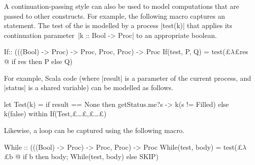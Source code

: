 A continuation-passing style can also be used to model computations that are
passed to other constructs.  For example, the following macro captures an
 statement.  The test of the  is modelled by a process
|test(k)| that applies its continuation parameter~|k :: Bool -> Proc| to an
appropriate boolean.
%
\begin{cspm}
If:: (((Bool) -> Proc) -> Proc, Proc, Proc) -> Proc
If(test, P, Q) = test(£$\lambda$£res @ if res then P else Q)
\end{cspm}
%
For example, Scala code  (where |result| is a parameter of the current process, and
|status| is a shared variable) can be modelled as follows. 
%
\begin{cspm}
let Test(k) = if result == None then getStatus.me?s -> k(s != Filled) else k(false)
within If(Test,£\ldots£,£\ldots£)
\end{cspm}
%
Likewise, a  loop can be captured using the following macro.
%
\begin{cspm}
While :: (((Bool) -> Proc) -> Proc, Proc) -> Proc
While(test, body) = test(£$\lambda$£b @ if b then body; While(test, body) else SKIP)
\end{cspm}
